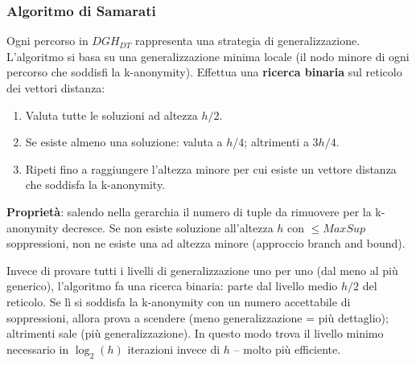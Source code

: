 \documentclass[a4paper,11pt]{article}
\begin{document}
\subsubsection{Algoritmo di Samarati}

\begin{definizione}
Ogni percorso in $DGH_{DT}$ rappresenta una strategia di generalizzazione. L'algoritmo si basa su una generalizzazione minima locale (il nodo minore di ogni percorso che soddisfi la k-anonymity). Effettua una \textbf{ricerca binaria} sul reticolo dei vettori distanza:
\begin{enumerate}
  \item Valuta tutte le soluzioni ad altezza $h/2$.
  \item Se esiste almeno una soluzione: valuta a $h/4$; altrimenti a $3h/4$.
  \item Ripeti fino a raggiungere l'altezza minore per cui esiste un vettore distanza che soddisfa la k-anonymity.
\end{enumerate}
\textbf{Propriet\`{a}}: salendo nella gerarchia il numero di tuple da rimuovere per la k-anonymity decresce. Se non esiste soluzione all'altezza $h$ con $\leq MaxSup$ soppressioni, non ne esiste una ad altezza minore (approccio branch and bound).
\end{definizione}

\begin{nota}
Invece di provare tutti i livelli di generalizzazione uno per uno (dal meno al più generico), l'algoritmo fa una ricerca binaria: parte dal livello medio $h/2$ del reticolo. Se lì si soddisfa la k-anonymity con un numero accettabile di soppressioni, allora prova a scendere (meno generalizzazione = più dettaglio); altrimenti sale (più generalizzazione). In questo modo trova il livello minimo necessario in $\log_2(h)$ iterazioni invece di $h$ -- molto più efficiente.
\end{nota}
\end{document}
